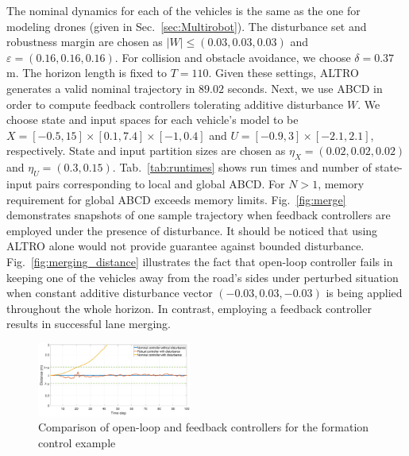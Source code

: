 The nominal dynamics for each of the vehicles is the same as the one  for modeling drones (given in Sec.~\ref{sec:Multirobot}). 
The disturbance set and robustness margin are chosen as $|W|\leq (0.03,0.03,0.03)$ and $\varepsilon=(0.16,0.16,0.16)$. %
For collision and obstacle avoidance, we choose $\delta=0.37$ m.
The horizon length is fixed to $T=110$. 
Given these settings, ALTRO generates a valid nominal trajectory in $89.02$ seconds. 
Next, we use ABCD in order to compute feedback controllers tolerating additive disturbance $W$. 
We choose state and input spaces for each vehicle's model to be $X=[-0.5,15]\times[0.1,7.4]\times[-1,0.4]$ and $U=[-0.9,3]\times[-2.1,2.1]$, respectively. 
State and input partition sizes are chosen as $\eta_{X}=(0.02,0.02,0.02)$ and $\eta_{U}=(0.3,0.15)$. 
Tab.~\ref{tab:runtimes} shows run times and number of state-input pairs corresponding to local and global ABCD. 
For $N>1$, memory requirement for global ABCD exceeds memory limits.
Fig.~\ref{fig:merge} demonstrates snapshots of one sample trajectory when feedback controllers are employed under the presence of disturbance. It should be noticed that using ALTRO alone would not provide guarantee against bounded disturbance.
Fig.~\ref{fig:merging_distance} illustrates the fact that open-loop controller fails in keeping one of the vehicles away from the road's sides under perturbed situation when constant additive disturbance vector $(-0.03 ,0.03,-0.03)$ is being applied throughout the whole horizon. 
In contrast, employing a feedback controller results in successful lane merging. 





\begin{figure}[t]
	\centering
	\includegraphics[width=0.45\textwidth]{figures/formation_dist2.eps}
	\caption{Comparison of open-loop and feedback controllers for the formation control example}
	\label{fig:formation_distance}
	\vspace*{-0.5cm}
\end{figure}

